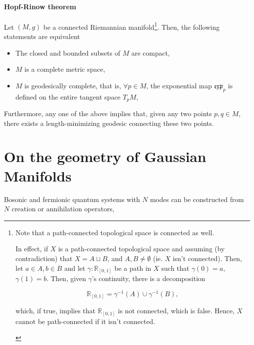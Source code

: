 \documentclass{homework}
\begin{document}
\paragraph{\textbf{Hopf-Rinow theorem}}

Let $(M,g)$ be a connected Riemannian manifold\footnote{Note that a path-connected topological space is connected as well. 
\begin{tcolorbox}[title=Proof: path-connectedness implies connectedness]
In effect, if $X$ is a path-connected topological space and assuming (by contradiction) that $X = A \sqcup B$, and $A, B \neq \emptyset$ (ie. $X$ isn't connected). Then, let $a \in A, b \in B$ and let $\gamma: \mathds{R}_{[0,1]}$ be a path in $X$ such that $\gamma(0) = a$, $\gamma(1) = b$. Then, given $\gamma$'s continuity, there is a decomposition 

$$
    \mathds{R}_{[0,1]} = \gamma^{-1}(A) \cup \gamma^{-1}(B),
$$

which, if true, implies that $\mathds{R}_{[0,1]}$ is not connected, which is false. Hence, $X$ cannot be path-connected if it isn't connected.
\end{tcolorbox}}. Then, the following statements are equivalent

\begin{itemize}
    \item The closed and bounded subsets of $M$ are compact,
    \item $M$ is a complete metric space, 
    \item $M$ is geodesically complete, that is, $\forall p \in M$, the exponential map $\mathfrak{e}\mathfrak{x}\mathfrak{p}_{p}$ is defined on the entire tangent space $T_p M$,
\end{itemize}

Furthermore, any one of the above implies that, given any two points $p, q \in M$, there exists a length-minimizing geodesic connecting these two points. \\

\section{On the geometry of Gaussian Manifolds}

Bosonic and fermionic quantum systems with $N$ modes can be constructed from $N$ creation or annihilation operators, 
\end{document}
